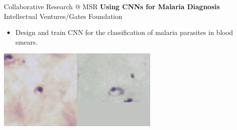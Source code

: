 \documentclass[t,xcolor=dvipsnames]{beamer}
\begin{document}
\usebackgroundtemplate{}

\begin{frame}{Collaborative Research @ MSR}
\textbf{Using CNNs for Malaria Diagnosis}\\{\footnotesize Intellectual Ventures/Gates Foundation}
\begin{itemize}
    \item Design and train CNN for the classification of malaria parasites in blood smears.
\end{itemize}
\vfill
\includegraphics[width=0.45\linewidth]{malarianegative}\hfill\includegraphics[width=0.45\linewidth]{malariapositive}
\end{frame}
\end{document}
